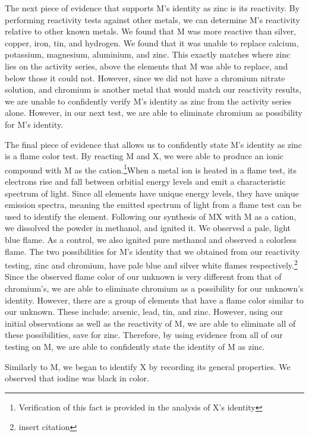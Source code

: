 \documentclass[titlepage]{article}
\begin{document}
The next piece of evidence that supports M's identity as zinc is its reactivity. By performing reactivity tests against other metals, we can determine M's reactivity relative to other known metals. We found that M was more reactive than silver, copper, iron, tin, and hydrogen. We found that it was unable to replace calcium, potassium, magnesium, aluminium, and zinc. This exactly matches where zinc lies on the activity series, above the elements that M was able to replace, and below those it could not. However, since we did not have a chromium nitrate solution, and chromium is another metal that would match our reactivity results, we are unable to confidently verify M's identity as zinc from the activity series alone. However, in our next test, we are able to eliminate chromium as possibility for M's identity.

The final piece of evidence that allows us to confidently state M's identity as zinc is a flame color test. By reacting M and X, we were able to produce an ionic compound with M as the cation.\footnote{Verification of this fact is provided in the analysis of X's identity}When a metal ion is heated in a flame test, its electrons rise and fall between orbitial energy levels and emit a characteristic spectrum of light. Since all elements have unique energy levels, they have unique emission spectra, meaning the emitted spectrum of light from a flame test can be used to identify the element. Following our synthesis of MX with M as a cation, we dissolved the powder in methanol, and ignited it. We observed a pale, light blue flame. As a control, we also ignited pure methanol and observed a colorless flame. The two possibilities for M's identity that we obtained from our reactivity testing, zinc and chromium, have pale blue and silver white flames respectively.\footnote{insert citation} Since the observed flame color of our unknown is very different from that of chromium's, we are able to eliminate chromium as a possibility for our unknown's identity. However, there are a group of elements that have a flame color similar to our unknown. These include: arsenic, lead, tin, and zinc. However, using our initial observations as well as the reactivity of M, we are able to eliminate all of these possibilities, save for zinc. Therefore, by using evidence from all of our testing on M, we are able to confidently state the identity of M as zinc.

\bigskip
Similarly to M, we began to identify X by recording its general properties. We observed that iodine was black in color. 




% 
% 
% 
\end{document}

